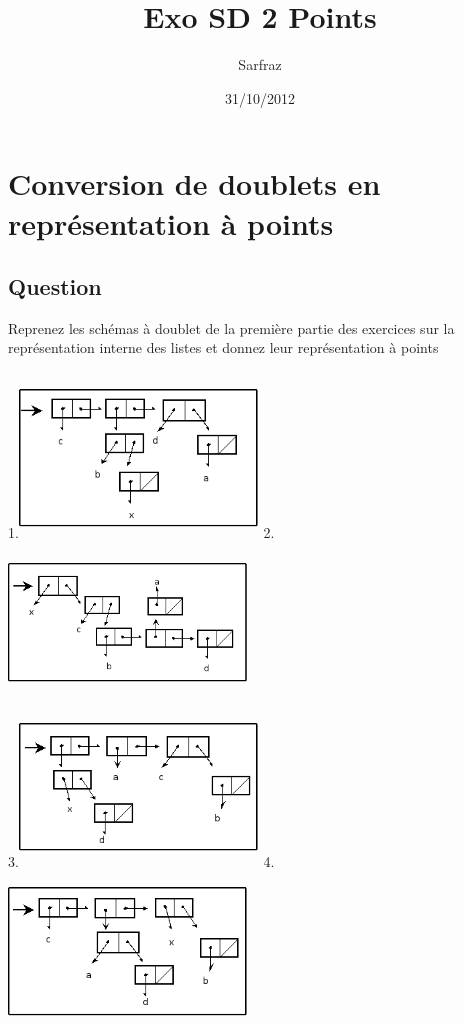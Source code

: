 \documentclass[a4paper, 11pt]{article}
\title{Exo SD 2 Points}
\author{Sarfraz \bsc{kapasi}}
\date{31/10/2012}
\begin{document}
%
\maketitle
%
\section{Conversion de doublets en représentation à points}
\subsection{Question}
Reprenez les schémas à doublet de la première partie des exercices sur la représentation interne des listes et donnez leur représentation à points\\\\
1.\includegraphics[height=120pt, width=180pt]{Pointeurs_Exo1.png}  2.\includegraphics[height=120pt, width=180pt]{Pointeurs_Exo2.png}\\
3.\includegraphics[height=120pt, width=180pt]{Pointeurs_Exo3.png}  4.\includegraphics[height=120pt, width=180pt]{Pointeurs_Exo4.png}\\
\end{document}
